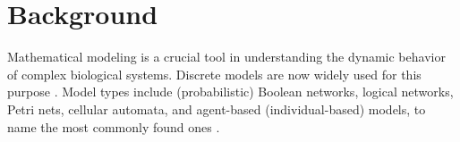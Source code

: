 \documentclass[10pt]{bmc_article}
\newenvironment{bmcformat}{\fussy\setboolean{publ}{true}}{\fussy}
\begin{document}
\begin{bmcformat}




\section*{Background}
Mathematical modeling is a crucial tool in understanding the dynamic behavior
of complex biological systems. Discrete models are now widely used for this
purpose \cite{Sahin2009,Heiser2009,Calzone2010}. Model types include (probabilistic) Boolean networks, logical
networks, Petri nets, cellular automata, and agent-based (individual-based)
models, to name the most commonly found ones \cite{Steggles, heiner-petri,
shmulevich, Chaouiya, cell-automata, springer_book}. 


\end{bmcformat}
\end{document}
